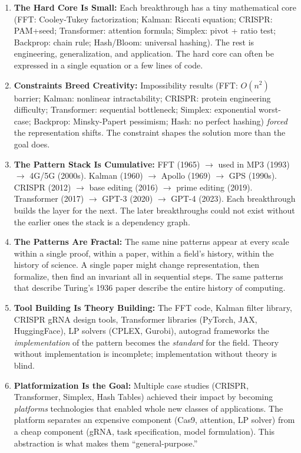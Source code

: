 \begin{enumerate}
\item \textbf{The Hard Core Is Small:} Each breakthrough has a tiny mathematical core (FFT: Cooley-Tukey factorization; Kalman: Riccati equation; CRISPR: PAM+seed; Transformer: attention formula; Simplex: pivot + ratio test; Backprop: chain rule; Hash/Bloom: universal hashing). The rest is engineering, generalization, and application. The hard core can often be expressed in a single equation or a few lines of code.

\item \textbf{Constraints Breed Creativity:} Impossibility results (FFT: $O(n^2)$ barrier; Kalman: nonlinear intractability; CRISPR: protein engineering difficulty; Transformer: sequential bottleneck; Simplex: exponential worst-case; Backprop: Minsky-Papert pessimism; Hash: no perfect hashing) \emph{forced} the representation shifts. The constraint shapes the solution more than the goal does.

\item \textbf{The Pattern Stack Is Cumulative:} FFT (1965) $\to$ used in MP3 (1993) $\to$ 4G/5G (2000s). Kalman (1960) $\to$ Apollo (1969) $\to$ GPS (1990s). CRISPR (2012) $\to$ base editing (2016) $\to$ prime editing (2019). Transformer (2017) $\to$ GPT-3 (2020) $\to$ GPT-4 (2023). Each breakthrough builds the layer for the next. The later breakthroughs could not exist without the earlier ones the stack is a dependency graph.

\item \textbf{The Patterns Are Fractal:} The same nine patterns appear at every scale within a single proof, within a paper, within a field's history, within the history of science. A single paper might change representation, then formalize, then find an invariant all in sequential steps. The same patterns that describe Turing's 1936 paper describe the entire history of computing.

\item \textbf{Tool Building Is Theory Building:} The FFT code, Kalman filter library, CRISPR gRNA design tools, Transformer libraries (PyTorch, JAX, HuggingFace), LP solvers (CPLEX, Gurobi), autograd frameworks the \emph{implementation} of the pattern becomes the \emph{standard} for the field. Theory without implementation is incomplete; implementation without theory is blind.

\item \textbf{Platformization Is the Goal:} Multiple case studies (CRISPR, Transformer, Simplex, Hash Tables) achieved their impact by becoming \emph{platforms} technologies that enabled whole new classes of applications. The platform separates an expensive component (Cas9, attention, LP solver) from a cheap component (gRNA, task specification, model formulation). This abstraction is what makes them ``general-purpose.''


\end{enumerate}
